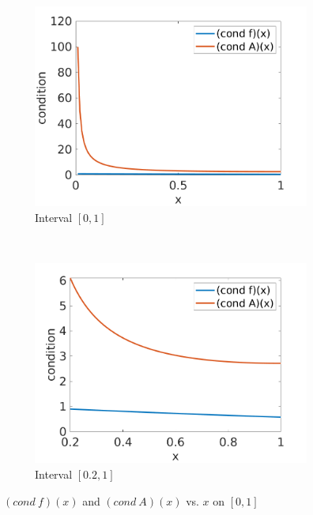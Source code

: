 \documentclass[a4paper, 12pt]{article}
\begin{document}
\begin{figure}[H]
    \centering
    \begin{subfigure}[b]{0.45\textwidth}
        \includegraphics[width=\textwidth]{q4_full.png}
        \caption{Interval $[0,1]$}
        \label{fig:full}
    \end{subfigure}
    ~ 
    \begin{subfigure}[b]{0.45\textwidth}
        \includegraphics[width=\textwidth]{q4_zoom.png}
        \caption{Interval $[0.2,1]$}
        \label{fig:zoom}
    \end{subfigure}
	\caption{$(cond\ f)(x)$ and $(cond\ A)(x)$ vs. $x$ on $[0,1]$}
	\label{fig:condition}
\end{figure}
\end{document}
